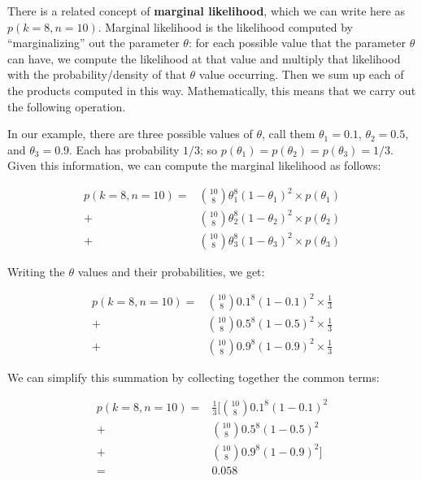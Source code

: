 \documentclass[12pt,]{krantz}
\theoremstyle{definition}
\theoremstyle{definition}
\theoremstyle{definition}
\theoremstyle{remark}
\begin{document}
There is a related concept of \textbf{marginal likelihood}, which we can
write here as \(p(k=8,n=10)\). Marginal likelihood is the likelihood
computed by ``marginalizing'' out the parameter \(\theta\): for each
possible value that the parameter \(\theta\) can have, we compute the
likelihood at that value and multiply that likelihood with the
probability/density of that \(\theta\) value occurring. Then we sum up
each of the products computed in this way. Mathematically, this means
that we carry out the following operation.

In our example, there are three possible values of \(\theta\), call them
\(\theta_1=0.1\), \(\theta_2=0.5\), and \(\theta_3=0.9\). Each has
probability \(1/3\); so \(p(\theta_1)=p(\theta_2)=p(\theta_3)=1/3\).
Given this information, we can compute the marginal likelihood as
follows:

\begin{equation}
\begin{split}
p(k=8,n=10) =& \binom{10}{8} \theta_1^8 (1-\theta_1)^{2} \times p(\theta_1) \\
            +& \binom{10}{8} \theta_2^8 (1-\theta_2)^{2}\times p(\theta_2) \\
            +& \binom{10}{8} \theta_3^8 (1-\theta_3)^{2}\times p(\theta_3)
\end{split}
\end{equation}

Writing the \(\theta\) values and their probabilities, we get:

\begin{equation}
\begin{split}
p(k=8,n=10) =& \binom{10}{8} 0.1^8 (1-0.1)^{2} \times \frac{1}{3} \\
            +& \binom{10}{8} 0.5^8 (1-0.5)^{2}\times \frac{1}{3} \\
            +& \binom{10}{8} 0.9^8 (1-0.9)^{2}\times \frac{1}{3}
\end{split}
\end{equation}

We can simplify this summation by collecting together the common terms:

\begin{equation}
\begin{split}
p(k=8,n=10) =& \frac{1}{3} [\binom{10}{8}  0.1^8 (1-0.1)^{2} \\
+& \binom{10}{8} 0.5^8 (1-0.5)^{2} \\
+& \binom{10}{8} 0.9^8 (1-0.9)^{2}] \\
=& 0.058 
\end{split}
\end{equation}
\end{document}
